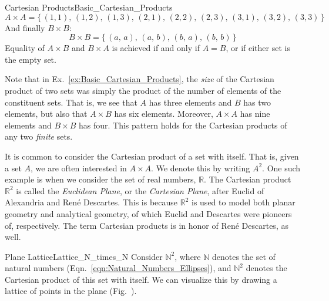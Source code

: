 \begin{lexample}{Cartesian Products}{Basic_Cartesian_Products}
\begin{equation}
                A\times{A}=\big\{\,(1,1),\,(1,2),\,(1,3),\,
                                   (2,1),\,(2,2),\,(2,3),\,
                                   (3,1),\,(3,2),\,(3,3)\,\big\}
            \end{equation}
            And finally $B\times{B}$:
            \begin{equation}
                B\times{B}=\big\{\,(a,\,a),\,(a,\,b),
                                 \,(b,\,a),\,(b,\,b)\,\big\}
            \end{equation}
            Equality of $A\times{B}$ and $B\times{A}$ is achieved if and only
            if $A=B$, or if either set is the empty set.
        \end{lexample}
        Note that in Ex.~\ref{ex:Basic_Cartesian_Products}, the \textit{size}
        of the Cartesian product of two sets was simply the product of the
        number of elements of the constituent sets. That is, we see that $A$
        has three elements and $B$ has two elements, but also that
        $A\times{B}$ has six elements. Moreover, $A\times{A}$ has nine
        elements and $B\times{B}$ has four. This pattern holds for the
        Cartesian products of any two \textit{finite} sets.
        \par\hfill\par
        It is common to consider the Cartesian product of a set with itself.
        That is, given a set $A$, we are often interested in $A\times{A}$. We
        denote this by writing $A^{2}$. One such example is when we consider
        the set of real numbers, $\mathbb{R}$. The Cartesian product
        $\mathbb{R}^{2}$ is called the \textit{Euclidean Plane},
        or the \textit{Cartesian Plane}, after Euclid of Alexandria and
        Ren\'{e} Descartes. This is because $\mathbb{R}^{2}$ is used to model
        both planar geometry and analytical geometry, of which Euclid and
        Descartes were pioneers of, respectively. The term Cartesian products
        is in honor of Ren\'{e} Descartes, as well.
        \begin{lexample}{Plane Lattice}{Lattice_N_times_N}
            Consider $\mathbb{N}^{2}$, where $\mathbb{N}$ denotes the set of
            natural numbers (Eqn.~\ref{eqn:Natural_Numbers_Ellipses}), and
            $\mathbb{N}^{2}$ denotes the Cartesian product of this set with
            itself. We can visualize this by drawing a lattice of points in the
            plane (Fig.~).
        \end{lexample}
